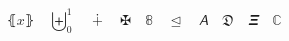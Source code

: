 \documentclass{report}
\begin{document}
\[
  ⦃ x ⦄
  \quad ⨄_{0}^{1}
  \quad ∔
  \quad ✠
  \quad 𝟠
  \quad ⊴
  \quad 𝘈
  \quad 𝔇
  \quad 𝞝
  \quad ℂ
\]
\end{document}
